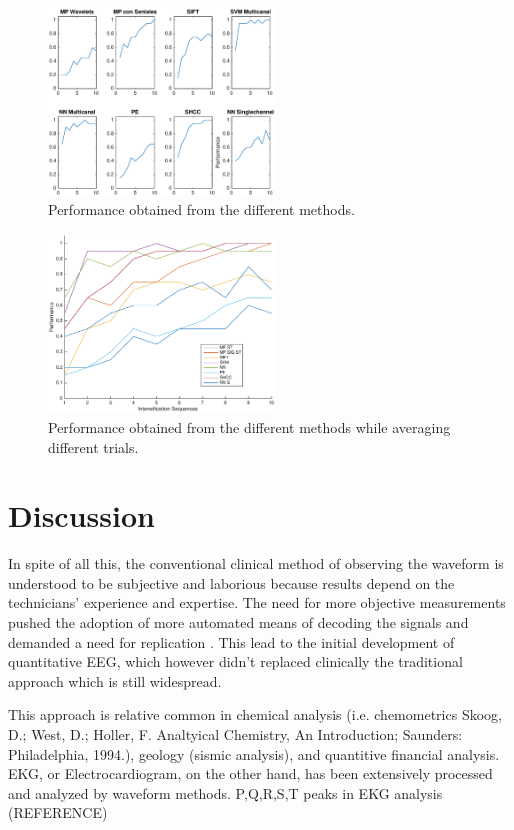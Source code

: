 \documentclass[sensors,article,submit,moreauthors,pdftex,10pt,a4paper]{mdpi}
\begin{document}
\begin{figure}[H]
\centering
\includegraphics[width=6cm]{images/performance.eps}
\caption{Performance obtained from the different methods.}
\label{fig:performance}
\end{figure}


\begin{figure}[H]
\centering
\includegraphics[width=6cm]{images/P300Performance.eps}
\caption{Performance obtained from the different methods while averaging different trials.}
\label{fig:p300performance}
\end{figure}


\section{Discussion}

In spite of all this, the conventional clinical method of observing the waveform is understood to be subjective and laborious because results depend on the technicians' experience and expertise.  The need for more objective measurements pushed the adoption of more automated means of decoding the signals and demanded a need for replication \citep{Thakor2004}.  This lead to the initial development of quantitative EEG, which however didn't replaced clinically the traditional approach which is still widespread.

This approach is relative common in chemical analysis (i.e. chemometrics Skoog, D.; West, D.; Holler, F. Analtyical Chemistry, An Introduction; Saunders: Philadelphia, 1994.), geology (sismic analysis), and quantitive financial analysis.  EKG, or Electrocardiogram, on the other hand, has been extensively processed and analyzed by waveform methods.
P,Q,R,S,T peaks in EKG analysis (REFERENCE) 
\end{document}
